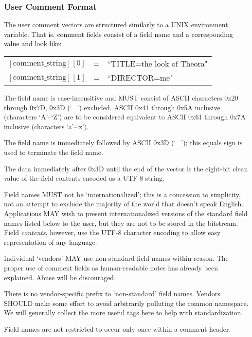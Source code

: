 \documentclass[11pt,letterpaper]{article}
\newcommand{\bitvar}[1]{\ensuremath{\left[\mathrm{#1}\right]}}
\begin{document}
\subsubsection{User Comment Format}

The user comment vectors are structured similarly to a UNIX environment
 variable.
That is, comment fields consist of a field name and a corresponding value and
 look like:
\begin{center}
\begin{tabular}{rcl}
$\bitvar{comment\_string}[0]$ & = & ``TITLE=the look of Theora" \\
$\bitvar{comment\_string}[1]$ & = & ``DIRECTOR=me"
\end{tabular}
\end{center}

The field name is case-insensitive and MUST consist of ASCII characters 0x20
 through 0x7D, 0x3D (`=') excluded.
ASCII 0x41 through 0x5A inclusive (characters `A'--`Z') are to be considered
 equivalent to ASCII 0x61 through 0x7A inclusive (characters `a'--`z').

The field name is immediately followed by ASCII 0x3D (`='); this equals sign is
 used to terminate the field name.

The data immediately after 0x3D until the end of the vector is the eight-bit
 clean value of the field contents encoded as a UTF-8 string.

Field names MUST not be `internationalized'; this is a concession to
 simplicity, not an attempt to exclude the majority of the world that doesn't
 speak English.
Applications MAY wish to present internationalized versions of the standard
 field names listed below to the user, but they are not to be stored in the
 bitstream.
Field {\em contents}, however, use the UTF-8 character encoding to allow easy
 representation of any language.

Individual `vendors' MAY use non-standard field names within reason.
The proper use of comment fields as human-readable notes has already been
 explained.
Abuse will be discouraged.

There is no vendor-specific prefix to `non-standard' field names.
Vendors SHOULD make some effort to avoid arbitrarily polluting the common
 namespace.
We will generally collect the more useful tags here to help with
 standardization.

Field names are not restricted to occur only once within a comment header.
\end{document}

